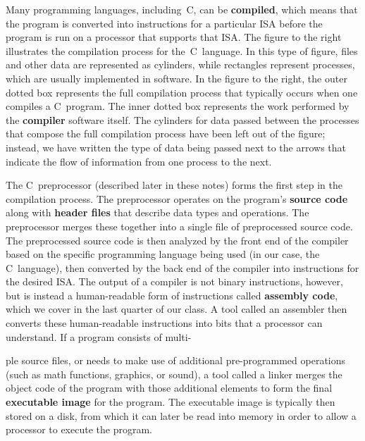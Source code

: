 \begin{minipage}{3.25in}
Many programming languages, including~C, can be 
{\bf compiled}, which means that the program is converted into 
instructions for a particular ISA before the program is run
on a processor that supports that ISA.
The figure to the right illustrates the compilation process for 
the~C~language.  
%
In this type of figure, files and other data are represented as cylinders,
while rectangles represent processes, which are usually implemented in 
software.
%
In the figure to the right, the outer dotted box represents the full 
compilation
process that typically occurs when one compiles a C~program.
The inner dotted box represents the work performed by the {\bf compiler}
software itself.
%
The cylinders for data passed between the processes that compose
the full compilation process
have been left out of the figure; instead, we have written the type
of data being passed next to the arrows that indicate the flow of information
from one process to the next.\mpline

The C~preprocessor (described later in these notes) forms the
first step in the compilation process.  The preprocessor
operates on the program's {\bf source code} along
with {\bf header files} that describe data types and
operations.  The preprocessor merges these together
into a single file of preprocessed source code.  The preprocessed
source code is then analyzed by the front end of the compiler based on the
specific programming language being used (in our case, the C~language),
then converted by the back end of the compiler
into instructions for the desired ISA.  The output of a compiler
is not binary instructions, however, but is instead
a human-readable form of instructions called {\bf assembly code},
which we cover in the last quarter of our class.  A tool called
an assembler then converts these human-readable instructions into
bits that a processor can understand.  If a program consists of
multi-\linebreak\mpdone
\end{minipage}\hspace{0.25in}%
\begin{minipage}{3in}
\end{minipage}

ple source files, or needs to make use of additional 
pre-programmed operations (such as math functions, graphics, or sound),
a tool called a linker merges the object code of the program with
those additional elements to form the final {\bf executable image}
for the program.  The executable image is typically then stored on
a disk, from which it can later be read into memory in order to
allow a processor to execute the program.

